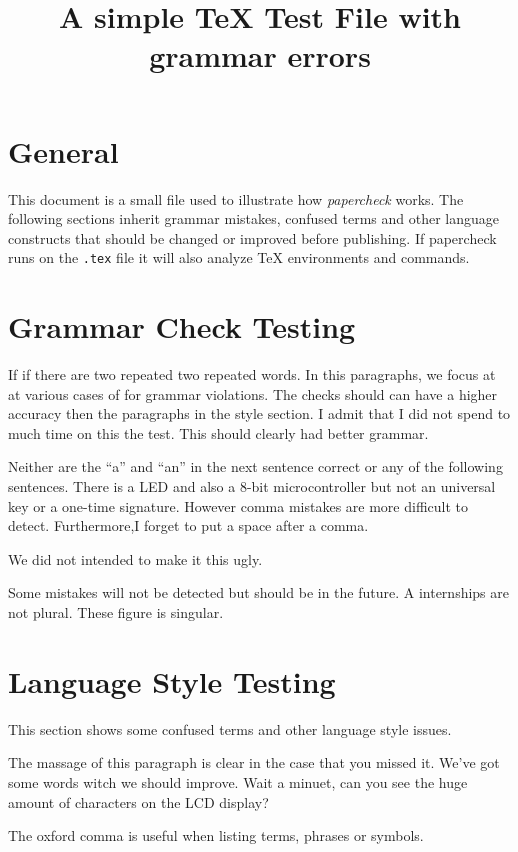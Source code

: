 \documentclass{scrartcl}
\title{A simple TeX Test File with grammar errors}
\begin{document}
\maketitle


\section{General}
This document is a small file used to illustrate how \emph{papercheck} works.
The following sections inherit grammar mistakes, confused terms and other language constructs that should be changed or improved before publishing.
If papercheck runs on the \verb!.tex! file it will also analyze TeX environments and commands.



\section{Grammar Check Testing}
If if there are 
two repeated two repeated words.
In this paragraphs, we focus at at various cases of for grammar violations.
The checks should can have a higher accuracy then the paragraphs in the style section.
I admit that I did not spend to much time on this the test.
This should clearly had better grammar.

Neither are the “a” and “an” in the next sentence correct or any of the following sentences.
There is a LED and also a 8-bit microcontroller but not an universal key or a one-time signature.
However comma mistakes are more difficult to detect.
Furthermore,I forget to put a space after a comma.

We did not intended to make it this ugly.

Some mistakes will not be detected but should be in the future.
A internships are not plural. These figure is singular.






\section{Language Style Testing}
This section shows some confused terms and other language style issues.

The massage of this paragraph is clear in the case that you missed it. We've got some words witch we should improve.
Wait a minuet, can you see the huge amount of characters on the LCD display? 

The oxford comma is useful when listing terms, phrases or symbols.
\end{document}

